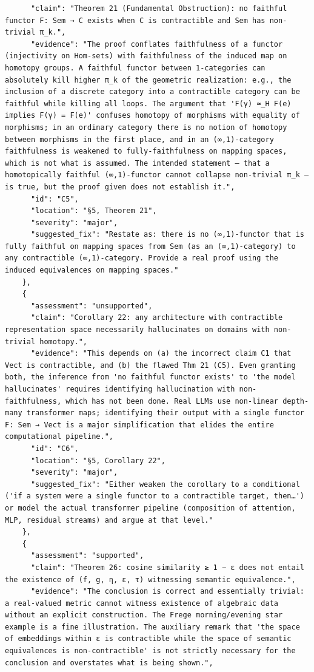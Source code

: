 \documentclass[11pt]{article}
\begin{document}
\begin{verbatim}
      "claim": "Theorem 21 (Fundamental Obstruction): no faithful functor F: Sem → C exists when C is contractible and Sem has non-trivial π_k.",
      "evidence": "The proof conflates faithfulness of a functor (injectivity on Hom-sets) with faithfulness of the induced map on homotopy groups. A faithful functor between 1-categories can absolutely kill higher π_k of the geometric realization: e.g., the inclusion of a discrete category into a contractible category can be faithful while killing all loops. The argument that 'F(γ) ≃_H F(e) implies F(γ) = F(e)' confuses homotopy of morphisms with equality of morphisms; in an ordinary category there is no notion of homotopy between morphisms in the first place, and in an (∞,1)-category faithfulness is weakened to fully-faithfulness on mapping spaces, which is not what is assumed. The intended statement — that a homotopically faithful (∞,1)-functor cannot collapse non-trivial π_k — is true, but the proof given does not establish it.",
      "id": "C5",
      "location": "§5, Theorem 21",
      "severity": "major",
      "suggested_fix": "Restate as: there is no (∞,1)-functor that is fully faithful on mapping spaces from Sem (as an (∞,1)-category) to any contractible (∞,1)-category. Provide a real proof using the induced equivalences on mapping spaces."
    },
    {
      "assessment": "unsupported",
      "claim": "Corollary 22: any architecture with contractible representation space necessarily hallucinates on domains with non-trivial homotopy.",
      "evidence": "This depends on (a) the incorrect claim C1 that Vect is contractible, and (b) the flawed Thm 21 (C5). Even granting both, the inference from 'no faithful functor exists' to 'the model hallucinates' requires identifying hallucination with non-faithfulness, which has not been done. Real LLMs use non-linear depth-many transformer maps; identifying their output with a single functor F: Sem → Vect is a major simplification that elides the entire computational pipeline.",
      "id": "C6",
      "location": "§5, Corollary 22",
      "severity": "major",
      "suggested_fix": "Either weaken the corollary to a conditional ('if a system were a single functor to a contractible target, then…') or model the actual transformer pipeline (composition of attention, MLP, residual streams) and argue at that level."
    },
    {
      "assessment": "supported",
      "claim": "Theorem 26: cosine similarity ≥ 1 − ε does not entail the existence of (f, g, η, ε, τ) witnessing semantic equivalence.",
      "evidence": "The conclusion is correct and essentially trivial: a real-valued metric cannot witness existence of algebraic data without an explicit construction. The Frege morning/evening star example is a fine illustration. The auxiliary remark that 'the space of embeddings within ε is contractible while the space of semantic equivalences is non-contractible' is not strictly necessary for the conclusion and overstates what is being shown.",

\end{verbatim}
\end{document}
